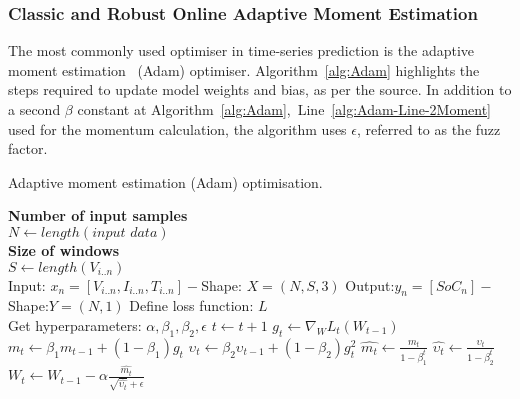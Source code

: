 %
\subsubsection{Classic and Robust Online Adaptive Moment Estimation}
The most commonly used optimiser in time-series prediction is the adaptive moment estimation~\cite{kingma_adam_2017} (Adam) optimiser.
\mbox{Algorithm~\ref{alg:Adam}} highlights the steps required to update model weights and bias, as per the source.
In addition to a second $\beta$ constant at \mbox{Algorithm~\ref{alg:Adam}, Line~\ref{alg:Adam-Line-2Moment}} used for the momentum calculation, the algorithm uses $\epsilon$, referred to as the fuzz factor.
\begin{algorithm}[H]%
  \caption{Adaptive moment estimation (Adam) optimisation.}
  \begin{algorithmic}[1]
    \STATE \textbf{Number of input samples} \\ $N\gets length(\textit{input data})$\\
    \STATE \textbf{Size of windows} \\ $S\gets length(V_{i..n})$\\
    \STATE Input: $x_n = [V_{i..n}, I_{i..n}, T_{i..n}] - $Shape: $X = (N, S, 3)$
    \STATE Output:$y_n = [SoC_{n}] - $Shape:$Y = (N, 1)$
    \STATE Define loss function: $L$ \\
    Get hyperparameters: $\alpha, \beta_1, \beta_2, \epsilon$
      \STATE $t \gets t+1$
      \STATE $g_t \gets \nabla_W L_t (W_{t-1})$ 
      \STATE $m_t \gets \beta_1 m_{t-1}+(1-\beta_1) g_t $ 
      \STATE $\upsilon_t \gets \beta_2 \upsilon_{t-1}+ \left(1-\beta_2 \right)g^2_t $ 
      \STATE $\hat{m_t} \gets \frac{m_t}{1-\beta^t_1}$ 
      \STATE $\hat{\upsilon_t} \gets \frac{\upsilon_t}{1-\beta^t_2} $ 
      \STATE $W_t \gets W_{t-1}- \alpha \frac{\hat{m_t}}{\sqrt{\hat{\upsilon_t}}+\epsilon} $ 
    \ENDWHILE
  \end{algorithmic}
  \label{alg:Adam}
\end{algorithm}

